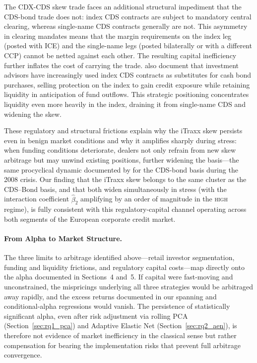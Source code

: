 The CDX-CDS skew trade faces an additional structural impediment that the
CDS-bond trade does not: index CDS contracts are subject to mandatory central
clearing, whereas single-name CDS contracts generally are not.  This asymmetry
in clearing mandates means that the margin requirements on the index leg
(posted with ICE) and the single-name legs (posted bilaterally or with a
different CCP) cannot be netted against each other.  The resulting capital
inefficiency further inflates the cost of carrying the trade.
\citet{boyarchenko2016trends} also document that investment advisors
have increasingly used index CDS contracts as substitutes for cash bond
purchases, selling protection on the index to gain credit exposure while
retaining liquidity in anticipation of fund outflows.  This strategic
positioning concentrates liquidity even more heavily in the index, draining
it from single-name CDS and widening the skew.

These regulatory and structural frictions explain why the iTraxx skew persists
even in benign market conditions and why it amplifies sharply during stress:
when funding conditions deteriorate, dealers not only refrain from new skew
arbitrage but may unwind existing positions, further widening the basis---the
same procyclical dynamic documented by \citet{mitchell2012arbitrage} for the
CDS-bond basis during the 2008 crisis.  Our finding that the iTraxx skew
belongs to the same cluster as the CDS--Bond basis, and that both widen
simultaneously in stress (with the interaction coefficient $\hat{\beta}_{2}$
amplifying by an order of magnitude in the \textsc{high} regime), is fully
consistent with this regulatory-capital channel operating across both segments
of the European corporate credit market.

\paragraph{From Alpha to Market Structure.}
The three limits to arbitrage identified above---retail investor segmentation,
funding and liquidity frictions, and regulatory capital costs---map directly
onto the alpha documented in Sections~4 and~5.  If capital were fast-moving and
unconstrained, the mispricings underlying all three strategies would be
arbitraged away rapidly, and the excess returns documented in our spanning and
conditional-alpha regressions would vanish.  The persistence of statistically
significant alpha, even after risk adjustment via rolling PCA
(Section~\ref{sec:rq1_pca}) and Adaptive Elastic Net
(Section~\ref{sec:rq2_aen}), is therefore not evidence of market inefficiency
in the classical sense but rather compensation for bearing the implementation
risks that prevent full arbitrage convergence.

